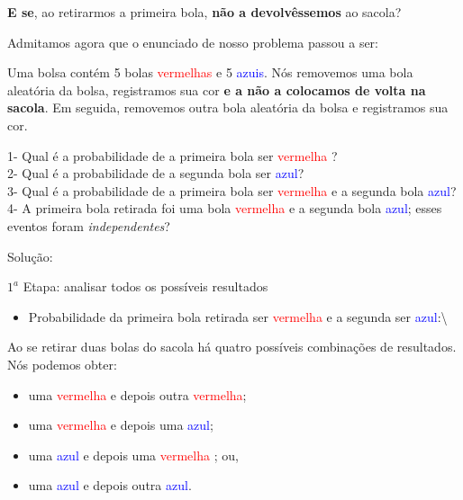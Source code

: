 \documentclass[
]{book}
\providecommand{\tightlist}{%
  \setlength{\itemsep}{0pt}\setlength{\parskip}{0pt}}
\begin{document}
\hfill\break

\textbf{E se}, ao retirarmos a primeira bola, \textbf{não a devolvêssemos} ao sacola?

\hfill\break

Admitamos agora que o enunciado de nosso problema passou a ser:

\hfill\break

Uma bolsa contém 5 bolas \textcolor{red}{vermelhas} e 5 \textcolor{blue}{azuis}. Nós removemos uma bola aleatória da bolsa, registramos sua cor \textbf{e a não a colocamos de volta na sacola}. Em seguida, removemos outra bola aleatória da bolsa e registramos sua cor.

\hfill\break

1- Qual é a probabilidade de a primeira bola ser \textcolor{red}{vermelha} ?\\
2- Qual é a probabilidade de a segunda bola ser \textcolor{blue}{azul}?\\
3- Qual é a probabilidade de a primeira bola ser \textcolor{red}{vermelha} e a segunda bola \textcolor{blue}{azul}?\\
4- A primeira bola retirada foi uma bola \textcolor{red}{vermelha} e a segunda bola \textcolor{blue}{azul}; esses eventos foram \emph{independentes}?

\hfill\break

Solução:

\hfill\break

\(1^{a}\) Etapa: analisar todos os possíveis resultados

\hfill\break

\begin{itemize}
\tightlist
\item
  Probabilidade da primeira bola retirada ser \textcolor{red}{vermelha} e a segunda ser \textcolor{blue}{azul}:\textbackslash{}
\end{itemize}

\hfill\break

Ao se retirar duas bolas do sacola há quatro possíveis combinações de resultados. Nós podemos obter:

\hfill\break

\begin{itemize}
\tightlist
\item
  uma \textcolor{red}{vermelha} e depois outra \textcolor{red}{vermelha};\\
\item
  uma \textcolor{red}{vermelha} e depois uma \textcolor{blue}{azul};\\
\item
  uma \textcolor{blue}{azul} e depois uma \textcolor{red}{vermelha} ; ou,\\
\item
  uma \textcolor{blue}{azul} e depois outra \textcolor{blue}{azul}.
\end{itemize}
\end{document}
